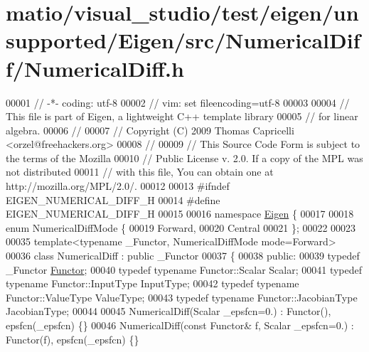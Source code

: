 \hypertarget{matio_2visual__studio_2test_2eigen_2unsupported_2_eigen_2src_2_numerical_diff_2_numerical_diff_8h_source}{}\section{matio/visual\+\_\+studio/test/eigen/unsupported/\+Eigen/src/\+Numerical\+Diff/\+Numerical\+Diff.h}
\label{matio_2visual__studio_2test_2eigen_2unsupported_2_eigen_2src_2_numerical_diff_2_numerical_diff_8h_source}

\begin{DoxyCode}
00001 \textcolor{comment}{// -*- coding: utf-8}
00002 \textcolor{comment}{// vim: set fileencoding=utf-8}
00003 
00004 \textcolor{comment}{// This file is part of Eigen, a lightweight C++ template library}
00005 \textcolor{comment}{// for linear algebra.}
00006 \textcolor{comment}{//}
00007 \textcolor{comment}{// Copyright (C) 2009 Thomas Capricelli <orzel@freehackers.org>}
00008 \textcolor{comment}{//}
00009 \textcolor{comment}{// This Source Code Form is subject to the terms of the Mozilla}
00010 \textcolor{comment}{// Public License v. 2.0. If a copy of the MPL was not distributed}
00011 \textcolor{comment}{// with this file, You can obtain one at http://mozilla.org/MPL/2.0/.}
00012 
00013 \textcolor{preprocessor}{#ifndef EIGEN\_NUMERICAL\_DIFF\_H}
00014 \textcolor{preprocessor}{#define EIGEN\_NUMERICAL\_DIFF\_H}
00015 
00016 \textcolor{keyword}{namespace }\hyperlink{namespace_eigen}{Eigen} \{ 
00017 
00018 \textcolor{keyword}{enum} NumericalDiffMode \{
00019     Forward,
00020     Central
00021 \};
00022 
00023 
00035 \textcolor{keyword}{template}<\textcolor{keyword}{typename} \_Functor, NumericalDiffMode mode=Forward>
00036 \textcolor{keyword}{class }NumericalDiff : \textcolor{keyword}{public} \_Functor
00037 \{
00038 \textcolor{keyword}{public}:
00039     \textcolor{keyword}{typedef} \_Functor \hyperlink{struct_functor}{Functor};
00040     \textcolor{keyword}{typedef} \textcolor{keyword}{typename} Functor::Scalar Scalar;
00041     \textcolor{keyword}{typedef} \textcolor{keyword}{typename} Functor::InputType InputType;
00042     \textcolor{keyword}{typedef} \textcolor{keyword}{typename} Functor::ValueType ValueType;
00043     \textcolor{keyword}{typedef} \textcolor{keyword}{typename} Functor::JacobianType JacobianType;
00044 
00045     NumericalDiff(Scalar \_epsfcn=0.) : Functor(), epsfcn(\_epsfcn) \{\}
00046     NumericalDiff(\textcolor{keyword}{const} Functor& f, Scalar \_epsfcn=0.) : Functor(f), epsfcn(\_epsfcn) \{\}

\end{DoxyCode}
